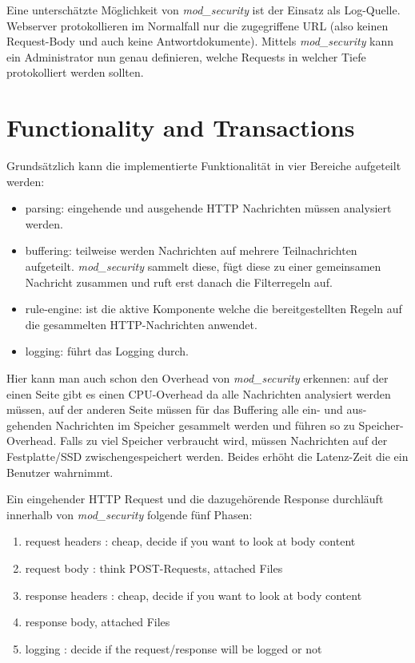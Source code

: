 Eine unterschätzte Möglichkeit von \textit{mod\_security} ist der Einsatz als Log-Quelle. Webserver protokollieren im Normalfall nur die zugegriffene URL (also keinen Request-Body und auch keine Antwortdokumente). Mittels \textit{mod\_security} kann ein Administrator nun genau definieren, welche Requests in welcher Tiefe protokolliert werden sollten.

\section{Functionality and Transactions}

Grundsätzlich kann die implementierte Funktionalität in vier Bereiche aufgeteilt werden:

\begin{itemize}
	\item parsing: eingehende und ausgehende HTTP Nachrichten müssen analysiert werden.
	\item buffering: teilweise werden Nachrichten auf mehrere Teilnachrichten aufgeteilt. \textit{mod\_security} sammelt diese, fügt diese zu einer gemeinsamen Nachricht zusammen und ruft erst danach die Filterregeln auf.
	\item rule-engine: ist die aktive Komponente welche die bereitgestellten Regeln auf die gesammelten HTTP-Nachrichten anwendet.
	\item logging: führt das Logging durch.
\end{itemize}

Hier kann man auch schon den Overhead von \textit{mod\_security} erkennen: auf der einen Seite gibt es einen CPU-Overhead da alle Nachrichten analysiert werden müssen, auf der anderen Seite müssen für das Buffering alle ein- und aus-gehenden Nachrichten im Speicher gesammelt werden und führen so zu Speicher-Overhead. Falls zu viel Speicher verbraucht wird, müssen Nachrichten auf der Festplatte/SSD zwischengespeichert werden. Beides erhöht die Latenz-Zeit die ein Benutzer wahrnimmt.

Ein eingehender HTTP Request und die dazugehörende Response durchläuft innerhalb von \textit{mod\_security} folgende fünf Phasen:

\begin{enumerate}
	\item request headers : cheap, decide if you want to look at body content
	\item request body : think POST-Requests, attached Files
	\item response headers : cheap, decide if you want to look at body content
	\item response body, attached Files
	\item logging : decide if the request/response will be logged or not
\end{enumerate}

